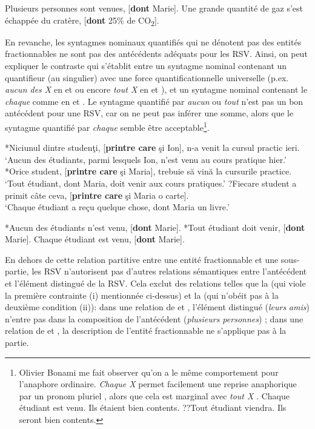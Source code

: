 \ea \label{ch3:ex57}
\ea 
Plusieurs personnes sont venues, [\textbf{dont} Marie]. \label{ch3:ex57a} 
\ex 
Une grande quantité de gaz s’est échappée du cratère, [\textbf{dont} 25\% de CO\textsubscript{2}]. \label{ch3:ex57b}  
\z 
\z

En revanche, les syntagmes nominaux quantifiés qui ne dénotent pas des entités fractionnables ne sont pas des antécédents adéquats pour les RSV. Ainsi, on peut expliquer le contraste qui s’établit entre un syntagme nominal contenant un quantifieur (au singulier) avec une force quantificationnelle universelle (p.ex. \textit{aucun des X} en  et  ou encore \textit{tout X} en  et ), et un syntagme nominal contenant le  \textit{chaque} comme en  et . Le syntagme quantifié par \textit{aucun} ou \textit{tout} n’est pas un bon antécédent pour une RSV, car on ne peut pas inférer une somme, alors que le syntagme quantifié par \textit{chaque} semble être acceptable\footnote{Olivier Bonami me fait observer qu’on a le même comportement pour l’anaphore ordinaire. \textit{Chaque X} permet facilement une reprise anaphorique par un pronom pluriel , alors que cela est marginal avec \textit{tout X} .
\ea \label{ch3:fn12i}
Chaque étudiant est venu. Ils étaient bien contents.
\z 
\ea \label{ch3:fn12ii}
??Tout étudiant viendra. Ils seront bien contents.
\z
}.

\ea \label{ch3:ex58} 
\ea
*Niciunul dintre studenţi, [\textbf{printre care} şi Ion], n-a venit la cursul practic ieri. \label{ch3:ex58a}\\
\glt ‘Aucun des étudiants, parmi lesquels Ion, n’est venu au cours pratique hier.’ 
\ex 
*Orice student, [\textbf{printre care} şi Maria], trebuie să vină la cursurile practice. \label{ch3:ex58b}\\
\glt ‘Tout étudiant, dont Maria, doit venir aux cours pratiques.’ 
\ex 
?Fiecare student a primit câte ceva, [\textbf{printre care} şi Maria o carte]. \label{ch3:ex58c}\\
\glt ‘Chaque étudiant a reçu quelque chose, dont Maria un livre.’
\z 
\z

\ea \label{ch3:ex59} 
\ea
*Aucun des étudiants n’est venu, [\textbf{dont} Marie]. \label{ch3:ex59a} 
\ex 
*Tout étudiant doit venir, [\textbf{dont} Marie]. \label{ch3:ex59b}
\ex
Chaque étudiant est venu, [\textbf{dont} Marie]. \label{ch3:ex59c}
\z 
\z

En dehors de cette relation partitive entre une entité fractionnable et une sous-partie, les RSV n’autorisent pas d’autres relations sémantiques entre l’antécédent et l’élément distingué de la RSV. Cela exclut des relations telles que la  (qui viole la première contrainte (i) mentionnée ci-dessus) et la  (qui n’obéit pas à la deuxième condition (ii)): dans une relation de   et , l’élément distingué (\textit{leurs} \textit{amis}) n’entre pas dans la composition de l’antécédent (\textit{plusieurs personnes}) ; dans une relation de   et , la description de l’entité fractionnable ne s’applique pas à la partie.

